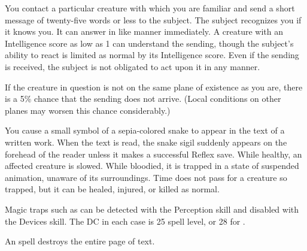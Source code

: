 \begin{spelleffect}
You contact a particular creature with which you are familiar and send a short message of twenty-five words or less to the subject. The subject recognizes you if it knows you. It can answer in like manner immediately. A creature with an Intelligence score as low as 1 can understand the sending, though the subject's ability to react is limited as normal by its Intelligence score. Even if the sending is received, the subject is not obligated to act upon it in any manner.
\par If the creature in question is not on the same plane of existence as you are, there is a 5\% chance that the sending does not arrive. (Local conditions on other planes may worsen this chance considerably.)
\end{spelleffect}

\begin{spelleffect}
You cause a small symbol of a sepia-colored snake to appear in the text of a written work. When the text is read, the snake sigil suddenly appears on the forehead of the reader unless it makes a successful Reflex save. While healthy, an affected creature is slowed. While bloodied, it is trapped in a state of suspended animation, unaware of its surroundings. Time does not pass for a creature so trapped, but it can be healed, injured, or killed as normal.
\end{spelleffect}
\begin{spellnotes}
Magic traps such as  can be detected with the Perception skill and disabled with the Devices skill. The DC in each case is 25 \add spell level, or 28 for .

An  spell destroys the entire page of text.
\end{spellnotes}

